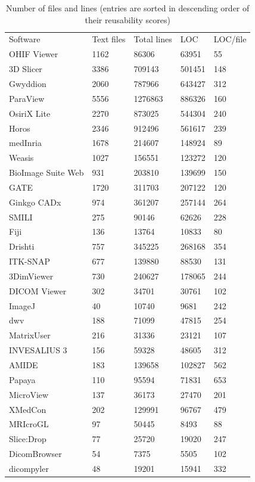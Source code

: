 \documentclass[final, 3p, times, authoryear]{elsarticle}
\begin{document}
\begin{table}[!ht]
\centering
\begin{tabular}{lllll}
\toprule
\multirow{2}{*}{Software} & \multirow{2}{*}{Text files} & \multirow{2}{*}{Total lines} & \multirow{2}{*}{LOC} & \multirow{2}{*}{LOC/file} \\
 &  &  &  &  \\ 
\midrule
OHIF Viewer & 1162 & 86306 & 63951 & 55 \\
3D Slicer & 3386 & 709143 & 501451 & 148 \\
Gwyddion & 2060 & 787966 & 643427 & 312 \\
ParaView & 5556 & 1276863 & 886326 & 160 \\
OsiriX Lite & 2270 & 873025 & 544304 & 240 \\
Horos & 2346 & 912496 & 561617 & 239 \\
medInria & 1678 & 214607 & 148924 & 89 \\
Weasis & 1027 & 156551 & 123272 & 120 \\
BioImage Suite Web & 931 & 203810 & 139699 & 150 \\
GATE & 1720 & 311703 & 207122 & 120 \\
Ginkgo CADx & 974 & 361207 & 257144 & 264 \\
SMILI & 275 & 90146 & 62626 & 228 \\
Fiji & 136 & 13764 & 10833 & 80 \\
Drishti & 757 & 345225 & 268168 & 354 \\
ITK-SNAP & 677 & 139880 & 88530 & 131 \\
3DimViewer & 730 & 240627 & 178065 & 244 \\
DICOM Viewer & 302 & 34701 & 30761 & 102 \\
ImageJ & 40 & 10740 & 9681 & 242 \\
dwv & 188 & 71099 & 47815 & 254 \\
MatrixUser & 216 & 31336 & 23121 & 107 \\
INVESALIUS 3 & 156 & 59328 & 48605 & 312 \\
AMIDE & 183 & 139658 & 102827 & 562 \\
Papaya & 110 & 95594 & 71831 & 653 \\
MicroView & 137 & 36173 & 27470 & 201 \\
XMedCon & 202 & 129991 & 96767 & 479 \\
MRIcroGL & 97 & 50445 & 8493 & 88 \\
Slice:Drop & 77 & 25720 & 19020 & 247 \\
DicomBrowser & 54 & 7375 & 5505 & 102 \\
dicompyler & 48 & 19201 & 15941 & 332 \\ 
\bottomrule
\end{tabular}
\caption{Number of files and lines (entries are sorted in descending order of
their reusability scores)}
\label{tab_loc_per_file}
\end{table}
\end{document}
